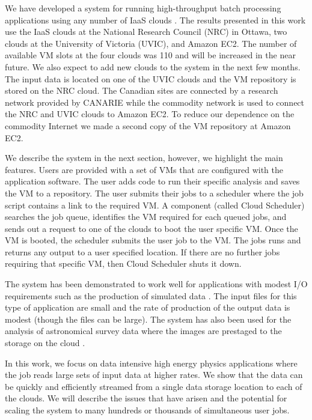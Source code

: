 \documentclass[10pt, conference, compsocconf]{IEEEtran}
\begin{document}
We have developed a system for running high-throughput batch processing
applications using any number of IaaS clouds \cite{cloud-scheduler}.
The results presented in this work use the IaaS clouds at the 
National Research Council (NRC) in Ottawa, two clouds at the 
University of Victoria (UVIC), and Amazon EC2.
The number of available VM slots at the four clouds was 110 and will be
increased in the near future.  
We also expect to add new clouds to the system in the next few months.
The input data is located on one of the UVIC clouds and the VM repository
is stored on the NRC cloud.
The Canadian sites are connected by a research network provided by CANARIE while the
commodity network is used to connect the NRC and UVIC clouds to Amazon EC2.
To reduce our dependence on the commodity Internet
we made a second copy of the VM repository at Amazon EC2.

We describe the system in the next section, however, we highlight 
the main features.
Users are provided with a set of VMs that are configured
with the application software.  
The user adds code to run their specific analysis 
and saves the VM to a repository.
The user submits their jobs to a scheduler where the job script
contains a link to the required VM.
A component (called Cloud Scheduler) searches the job queue, identifies
the VM required for each queued jobs, and sends out a request to one
of the clouds to boot the user specific VM.
Once the VM is booted, the scheduler submits the user job to the VM.
The jobs runs and returns any output to a user specified location.
If there are no further jobs requiring that specific VM, then
Cloud Scheduler shuts it down.

The system has been demonstrated to work well for applications with 
modest I/O requirements such as the production of 
simulated data \cite{kyle:hpcs}.
The input files for this type of application are small and the rate 
of production of the output data is modest (though the files can be large).
The system has also been used for the analysis of astronomical survey
data where the images are prestaged to the storage
on the cloud \cite{kyle:hpcs}.

In this work, we focus on data intensive high energy physics applications 
where the job reads large sets of input data at higher rates.
We show that the data can be quickly and efficiently
streamed from a single data storage location to each of the clouds.
We will describe the issues that have arisen and the potential for 
scaling the system to many hundreds or thousands of simultaneous user jobs.
\end{document}
